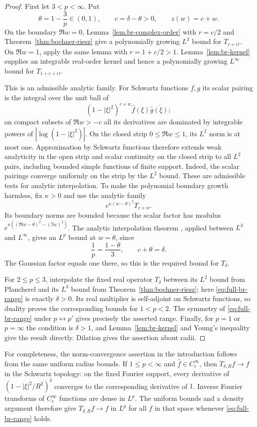 \begin{proof}
First let $3<p<\infty$.  Put
\[
 \theta=1-\frac3p\in(0,1),\qquad c=\delta-\theta>0,
 \qquad z(w)=c+w.
\]
On the boundary $\Re w=0$, Lemma~\ref{lem:br-complex-order} with
$r=c/2$ and Theorem~\ref{thm:bochner-riesz} give a polynomially
growing $L^3$ bound for $T_{c+i\tau}$.  On $\Re w=1$, apply the
same lemma with $r=1+c/2>1$.  Lemma~\ref{lem:br-kernel} supplies
an integrable real-order kernel and hence a polynomially growing
$L^\infty$ bound for $T_{1+c+i\tau}$.

This is an admissible analytic family.  For Schwartz functions $f,g$
its scalar pairing is the integral over the unit ball of
\[
 (1-|\xi|^2)^{c+w}\widehat f(\xi)\overline{\widehat g(\xi)};
\]
on compact subsets of $\Re w>-c$ all its derivatives are dominated
by integrable powers of $|\log(1-|\xi|^2)|$.  On the closed strip
$0\le\Re w\le1$, its $L^2$ norm is at most one.  Approximation by
Schwartz functions therefore extends weak analyticity in the open
strip and scalar continuity on the closed strip to all $L^2$ pairs,
including bounded simple functions of finite support.  Indeed, the
scalar pairings converge uniformly on the strip by the $L^2$ bound.
These are admissible tests for analytic interpolation.
To make the polynomial boundary growth harmless,
fix $\kappa>0$ and use the analytic family
\[
 e^{\kappa(w-\theta)^2}T_{c+w}.
\]
Its boundary norms are bounded because the scalar factor has modulus
$e^{\kappa((\Re w-\theta)^2-(\Im w)^2)}$.  The analytic
interpolation theorem \cite{Stein1956}, applied between $L^3$ and
$L^\infty$, gives an $L^p$ bound at $w=\theta$, since
\[
 \frac1p=\frac{1-\theta}{3},
 \qquad c+\theta=\delta.
\]
The Gaussian factor equals one there, so this is the required bound
for $T_\delta$.

For $2\le p\le3$, interpolate the fixed real operator $T_\delta$
between its $L^2$ bound from Plancherel and its $L^3$ bound from
Theorem~\ref{thm:bochner-riesz}; here \eqref{eq:full-br-range} is
exactly $\delta>0$.  Its real multiplier is self-adjoint on Schwartz
functions, so duality proves the corresponding bounds for
$1<p<2$.  The symmetry of \eqref{eq:full-br-range} under
$p\leftrightarrow p'$ gives precisely the asserted range.
Finally, for $p=1$ or $p=\infty$ the condition is $\delta>1$, and
Lemma~\ref{lem:br-kernel} and Young's inequality give the result
directly.  Dilation gives the assertion about radii.
\end{proof}

For completeness, the norm-convergence assertion in the introduction follows
from the same uniform radius bounds. If $1\le p<\infty$ and
$\widehat f\in C_c^\infty$, then $T_{\delta,R}f\to f$ in the
Schwartz topology: on the fixed Fourier support, every derivative of
$(1-|\xi|^2/R^2)^\delta$ converges to the corresponding derivative
of $1$. Inverse Fourier transforms of $C_c^\infty$ functions are dense
in $L^p$. The uniform bounds and a density argument therefore give
$T_{\delta,R}f\to f$ in $L^p$ for all $f$ in that space whenever
\eqref{eq:full-br-range} holds.
